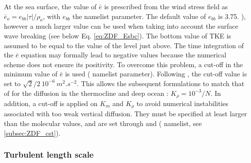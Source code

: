 \documentclass[../main/NEMO_manual]{subfiles}
\begin{document}
At the sea surface, the value of $\bar{e}$ is prescribed from the wind stress field as
$\bar{e}_o = e_{bb} |\tau| / \rho_o$, with $e_{bb}$ the  namelist parameter.
The default value of $e_{bb}$ is 3.75. \citep{gaspar.gregoris.ea_JGR90}), however a much larger value can be used when
taking into account the surface wave breaking (see below Eq. \autoref{eq:ZDF_Esbc}).
The bottom value of TKE is assumed to be equal to the value of the level just above.
The time integration of the $\bar{e}$ equation may formally lead to negative values because
the numerical scheme does not ensure its positivity.
To overcome this problem, a cut-off in the minimum value of $\bar{e}$ is used ( namelist parameter).
Following \citet{gaspar.gregoris.ea_JGR90}, the cut-off value is set to $\sqrt{2}/2~10^{-6}~m^2.s^{-2}$.
This allows the subsequent formulations to match that of \citet{gargett_JMR84} for the diffusion in
the thermocline and deep ocean :  $K_\rho = 10^{-3} / N$.
In addition, a cut-off is applied on $K_m$ and $K_\rho$ to avoid numerical instabilities associated with
too weak vertical diffusion.
They must be specified at least larger than the molecular values, and are set through  and
 ( namelist, see \autoref{subsec:ZDF_cst}).

\subsubsection{Turbulent length scale}
\end{document}
